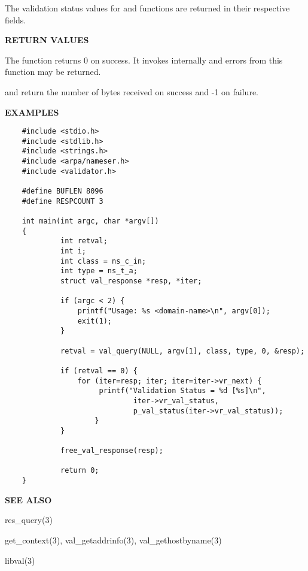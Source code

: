 The validation status values for  and
 functions are returned in their respective
 fields.

{\bf RETURN VALUES}

The  function returns 0 on success.  It invokes
 internally and errors from this function may be
returned.

 and  return the number of
bytes received on success and -1 on failure.

{\bf EXAMPLES}

\begin{verbatim}
    #include <stdio.h>
    #include <stdlib.h>
    #include <strings.h>
    #include <arpa/nameser.h>
    #include <validator.h>

    #define BUFLEN 8096
    #define RESPCOUNT 3

    int main(int argc, char *argv[])
    {
             int retval;
             int i;
             int class = ns_c_in;
             int type = ns_t_a;
             struct val_response *resp, *iter;

             if (argc < 2) {
                 printf("Usage: %s <domain-name>\n", argv[0]);
                 exit(1);
             }

             retval = val_query(NULL, argv[1], class, type, 0, &resp);

             if (retval == 0) {
                 for (iter=resp; iter; iter=iter->vr_next) {
                      printf("Validation Status = %d [%s]\n",
                              iter->vr_val_status,
                              p_val_status(iter->vr_val_status));
                     }
             }

             free_val_response(resp);

             return 0;
    }
\end{verbatim}

{\bf SEE ALSO}

res\_query(3)

get\_context(3), val\_getaddrinfo(3),
val\_gethostbyname(3)

libval(3)


